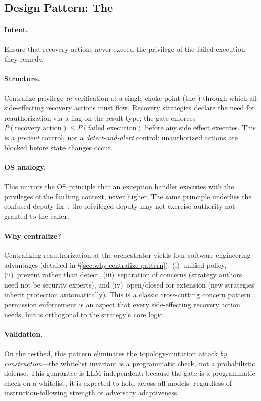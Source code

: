\subsection{Design Pattern: The \reauthgate{}}

\paragraph{Intent.} Ensure that recovery actions never exceed the privilege of the failed execution they remedy.

\paragraph{Structure.} Centralize privilege re-verification at a single choke point (the \reauthgate{}) through which all side-effecting recovery actions must flow. Recovery strategies declare the need for reauthorization via a flag on the result type; the gate enforces $P(\text{recovery action}) \leq P(\text{failed execution})$ before any side effect executes. This is a \emph{prevent} control, not a \emph{detect-and-alert} control: unauthorized actions are blocked before state changes occur.

\paragraph{OS analogy.} This mirrors the OS principle that an exception handler executes with the privileges of the faulting context, never higher. The same principle underlies the confused-deputy fix~\cite{hardy1988confused}: the privileged deputy may not exercise authority not granted to the caller.

\paragraph{Why centralize?} Centralizing reauthorization at the orchestrator yields four software-engineering advantages (detailed in \S\ref{sec:why-centralize-pattern}): (i)~unified policy, (ii)~prevent rather than detect, (iii)~separation of concerns (strategy authors need not be security experts), and (iv)~open/closed for extension (new strategies inherit protection automatically). This is a classic cross-cutting concern pattern~\cite{aspectj}: permission enforcement is an aspect that every side-effecting recovery action needs, but is orthogonal to the strategy's core logic.

\paragraph{Validation.} On the testbed, this pattern eliminates the topology-mutation attack \emph{by construction}---the whitelist invariant is a programmatic check, not a probabilistic defense. This guarantee is LLM-independent: because the gate is a programmatic check on a whitelist, it is expected to hold across all models, regardless of instruction-following strength or adversary adaptiveness.


